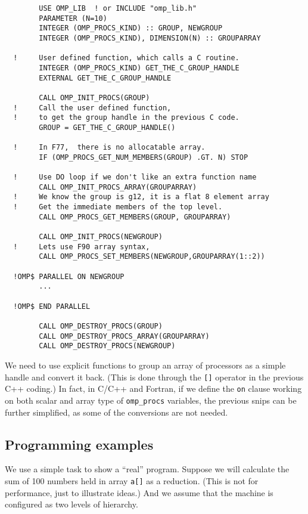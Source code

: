 {\footnotesize
\begin{verbatim}
        USE OMP_LIB  ! or INCLUDE "omp_lib.h"
        PARAMETER (N=10)
        INTEGER (OMP_PROCS_KIND) :: GROUP, NEWGROUP
        INTEGER (OMP_PROCS_KIND), DIMENSION(N) :: GROUPARRAY

  !     User defined function, which calls a C routine.
        INTEGER (OMP_PROCS_KIND) GET_THE_C_GROUP_HANDLE
        EXTERNAL GET_THE_C_GROUP_HANDLE

        CALL OMP_INIT_PROCS(GROUP)
  !     Call the user defined function,
  !     to get the group handle in the previous C code.
        GROUP = GET_THE_C_GROUP_HANDLE()

  !     In F77,  there is no allocatable array.
        IF (OMP_PROCS_GET_NUM_MEMBERS(GROUP) .GT. N) STOP

  !     Use DO loop if we don't like an extra function name
        CALL OMP_INIT_PROCS_ARRAY(GROUPARRAY)
  !     We know the group is g12, it is a flat 8 element array
  !     Get the immediate members of the top level.
        CALL OMP_PROCS_GET_MEMBERS(GROUP, GROUPARRAY)

        CALL OMP_INIT_PROCS(NEWGROUP)
  !     Lets use F90 array syntax,
        CALL OMP_PROCS_SET_MEMBERS(NEWGROUP,GROUPARRAY(1::2))

  !OMP$ PARALLEL ON NEWGROUP
        ...

  !OMP$ END PARALLEL

        CALL OMP_DESTROY_PROCS(GROUP)
        CALL OMP_DESTROY_PROCS_ARRAY(GROUPARRAY)
        CALL OMP_DESTROY_PROCS(NEWGROUP)
\end{verbatim}
}

We need to use explicit functions to group an array of processors as a simple
handle and convert it back. (This is done through the \texttt{[]} operator in
the previous C++ coding.) In fact, in C/C++ and Fortran, if we define the
\texttt{on} clause working on both scalar and array type of \texttt{omp\_procs}
variables, the previous snips can be further simplified, as some of the
conversions are not needed.

\subsection{Programming examples}

We use a simple task to show a ``real'' program. Suppose we will calculate the
sum of 100 numbers held in array \texttt{a[]} as a reduction. (This is not for
performance, just to illustrate ideas.) And we assume that the machine is
configured as two levels of hierarchy. 

